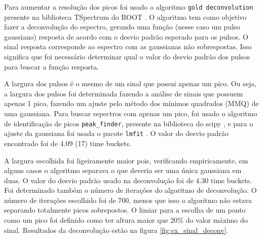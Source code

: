\documentclass[a4paper,12pt,oneside]{book}
\begin{document}
\par Para aumentar a resolução dos picos foi usado o algoritmo \texttt{gold deconvolution} presente na biblioteca TSpectrum do ROOT \cite{paper_gold_deconv}. O algoritmo tem como objetivo fazer a deconvolução do espectro, gerando uma função (nesse caso um pulso gaussiano) resposta de acordo com o desvio padrão esperado para os pulsos. O sinal resposta corresponde ao espectro com as gaussianas não sobrespostas. Isso significa que foi necessário determinar qual o valor do desvio padrão dos pulsos para buscar a função resposta.

\par A largura dos pulsos é o mesmo de um sinal que possui apenas um pico. Ou seja, a largura dos pulsos foi determinada fazendo a análise de sinais que possuem apenas 1 pico, fazendo um ajuste pelo método dos mínimos quadrados (MMQ) de uma gaussiana. Para buscar espectros com apenas um pico, foi usado o algoritmo de identificação de picos \texttt{peak\_finder}, presente na biblioteca do scipy \cite{scipy}, e para o ajuste da gaussiana foi usada o pacote \texttt{lmfit} \cite{lmfit}. O valor do desvio padrão encontrado foi de 4.09 (17) time buckets.

\par A largura escolhida foi ligeiramente maior pois, verificando empiricamente, em alguns casos o algoritmo separava o que deveria ser uma única gaussiana em duas. O valor do desvio padrão usado na deconvolução foi de 4.30 time buckets. Foi determinado também o número de iterações do algoritmo de deconvolução. O número de iterações escolhido foi de 700, menos que isso o algoritmo não estava separando totalmente picos sobrepostos. O limiar para a escolha de um ponto como um pico foi definido como ter altura maior que 20\% do valor máximo do sinal. Resultados da deconvolução estão na figura \ref{fig:ex_sinal_deconv}.
\end{document}
